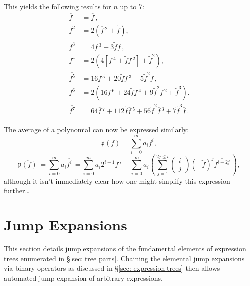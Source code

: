 \documentclass[10pt]{article}
\newcommand{\avg}[1]{\overline{#1}\,}
\newcommand{\invavg}[1]{\widetilde{#1}}
\begin{document}
This yields the following results for $n$ up to 7:
\begin{equation}
	\begin{aligned}
		\avg{f} &= \avg{f}, \\
		\avg{f^2} &= 2\left(\avg{f}^2 + \invavg{f}\right), \\
		\avg{f^3} &= 4\avg{f}^3 + 3\invavg{f}\avg{f}, \\
		\avg{f^4} &= 2\left(4\left[\avg{f}^4 + \invavg{f}\avg{f}^2\right] + \invavg{f}^2\right), \\
		\avg{f^5} &= 16\avg{f}^5 + 20\invavg{f}\avg{f}^3 + 5\invavg{f}^2\avg{f}, \\
		\avg{f^6} &= 2\left(16\avg{f}^6 + 24\invavg{f}\avg{f}^4 + 9\invavg{f}^2\avg{f}^2 + \invavg{f}^3\right). \\
		\avg{f^7} &= 64\avg{f}^7 + 112\invavg{f}\avg{f}^5 + 56\invavg{f}^2\avg{f}^3 + 7\invavg{f}^3\avg{f}. \\
	\end{aligned}
\end{equation}

The average of a polynomial can now be expressed similarly:
\begin{equation}
	\mathfrak{p}(f) = \sum_{i=0}^{m}a_i f^i,
\end{equation}
\begin{equation}
	\avg{\mathfrak{p}(f)} = \sum_{i=0}^{m}a_i \avg{f^i} = \sum_{i=0}^{m}a_i2^{i-1}\avg{f}^i - \sum_{i=0}^{m}a_i\left(\sum_{j=1}^{2j\leq i}\begin{pmatrix}i \\ j\end{pmatrix}\left(-\invavg{f}\right)^j\avg{f^{i-2j}}\right),
\end{equation}
although it isn't immediately clear how one might simplify this expression further\ldots






\section{Jump Expansions} \label{sec: fundamental jumps}
This section details jump expansions of the fundamental elements of expression trees enumerated in \S\ref{sec: tree parts}.
Chaining the elemental jump expansions via binary operators as discussed in \S\ref{sec: expression trees} then allows automated jump expansion of arbitrary expressions.
\end{document}
